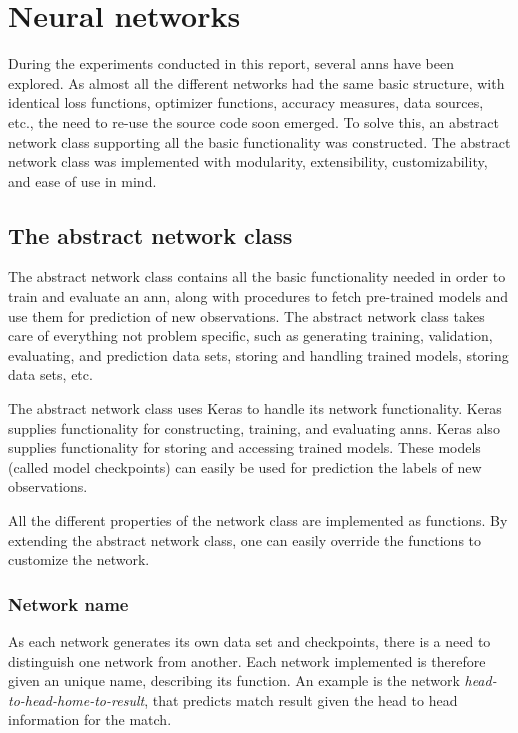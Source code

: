 \section{Neural networks}

During the experiments conducted in this report, several \glspl{ann} have been explored. As almost all the different networks had the same basic structure, with identical loss functions, optimizer functions, accuracy measures, data sources, etc., the need to re-use the source code soon emerged. To solve this, an abstract network class supporting all the basic functionality was constructed. The abstract network class was implemented with modularity, extensibility, customizability, and ease of use in mind. 

\subsection{The abstract network class}

The abstract network class contains all the basic functionality needed in order to train and evaluate an \gls{ann}, along with procedures to fetch pre-trained models and use them for prediction of new observations. The abstract network class takes care of everything not problem specific, such as generating training, validation, evaluating, and prediction data sets, storing and handling trained models, storing data sets, etc. 

The abstract network class uses Keras to handle its network functionality. Keras supplies functionality for constructing, training, and evaluating \glspl{ann}. Keras also supplies functionality for storing and accessing trained models. These models (called model checkpoints) can easily be used for prediction the labels of new observations.

All the different properties of the network class are implemented as functions. By extending the abstract network class, one can easily override the functions to customize the network.

\subsubsection{Network name}

As each network generates its own data set and checkpoints, there is a need to distinguish one network from another. Each network implemented is therefore given an unique name, describing its function. An example is the network \textit{head-to-head-home-to-result}, that predicts match result given the head to head information for the match.

